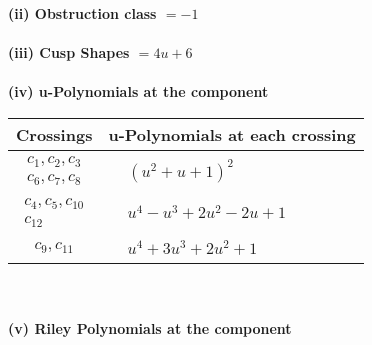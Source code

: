 \documentclass[1p]{elsarticle_modified}
\theoremstyle{definition}
\begin{document}
\flushleft \textbf{(ii) Obstruction class $= -1$}\\~\\
\flushleft \textbf{(iii) Cusp Shapes $= 4 u+6$}\\~\\
\newpage\renewcommand{\arraystretch}{1}
\flushleft \textbf{(iv) u-Polynomials at the component}\newline \\
\begin{tabular}{m{50pt}|m{274pt}}
Crossings & \hspace{64pt}u-Polynomials at each crossing \\
\hline $$\begin{aligned}c_{1},c_{2},c_{3}\\c_{6},c_{7},c_{8}\end{aligned}$$&$\begin{aligned}
&(u^2+u+1)^2
\end{aligned}$\\
\hline $$\begin{aligned}c_{4},c_{5},c_{10}\\c_{12}\end{aligned}$$&$\begin{aligned}
&u^4- u^3+2 u^2-2 u+1
\end{aligned}$\\
\hline $$\begin{aligned}c_{9},c_{11}\end{aligned}$$&$\begin{aligned}
&u^4+3 u^3+2 u^2+1
\end{aligned}$\\
\hline
\end{tabular}\\~\\
\newpage\renewcommand{\arraystretch}{1}
\flushleft \textbf{(v) Riley Polynomials at the component}\newline \\
\end{document}
